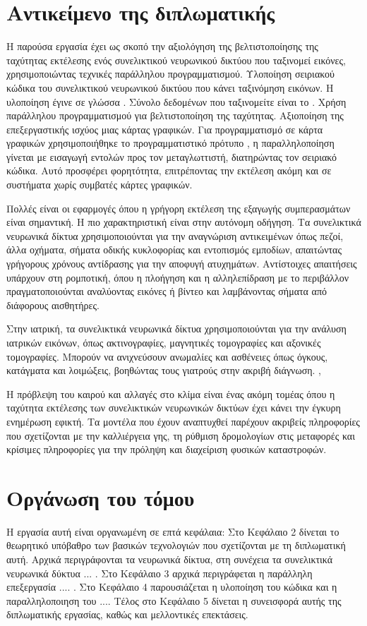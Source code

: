 \section{Αντικείμενο της διπλωματικής}
Η παρούσα εργασία έχει ως σκοπό την αξιολόγηση της βελτιστοποίησης της ταχύτητας εκτέλεσης ενός συνελικτικού νευρωνικού δικτύου που ταξινομεί εικόνες, χρησιμοποιώντας τεχνικές παράλληλου προγραμματισμού. 
Υλοποίηση σειριακού κώδικα του συνελικτικού νευρωνικού δικτύου που κάνει ταξινόμηση εικόνων.
Η υλοποίηση έγινε σε γλώσσα .
Σύνολο δεδομένων που ταξινομείτε είναι το .
Χρήση παράλληλου προγραμματισμού για βελτιστοποίηση της ταχύτητας.
Αξιοποίηση της επεξεργαστικής ισχύος μιας κάρτας γραφικών.
Για προγραμματισμό σε κάρτα γραφικών χρησιμοποιήθηκε το προγραμματιστικό πρότυπο , η παραλληλοποίηση γίνεται με εισαγωγή εντολών προς τον μεταγλωττιστή, διατηρώντας τον σειριακό κώδικα.
Αυτό προσφέρει φορητότητα, επιτρέποντας την εκτέλεση ακόμη και σε συστήματα χωρίς συμβατές κάρτες γραφικών.

 Πολλές είναι οι εφαρμογές όπου η γρήγορη εκτέλεση της εξαγωγής συμπερασμάτων είναι σημαντική. Η πιο χαρακτηριστική είναι στην αυτόνομη οδήγηση. Τα συνελικτικά νευρωνικά δίκτυα χρησιμοποιούνται για την αναγνώριση αντικειμένων όπως πεζοί, άλλα οχήματα, σήματα οδικής κυκλοφορίας και εντοπισμός εμποδίων, απαιτώντας γρήγορους χρόνους αντίδρασης για την αποφυγή ατυχημάτων. Αντίστοιχες απαιτήσεις υπάρχουν στη ρομποτική, όπου η πλοήγηση και η αλληλεπίδραση με το περιβάλλον πραγματοποιούνται αναλύοντας εικόνες ή βίντεο και λαμβάνοντας σήματα από διάφορους αισθητήρες.\cite{Ilas2020}

Στην ιατρική, τα συνελικτικά νευρωνικά δίκτυα χρησιμοποιούνται για την ανάλυση ιατρικών εικόνων, όπως ακτινογραφίες, μαγνητικές τομογραφίες και αξονικές τομογραφίες. Μπορούν να ανιχνεύσουν ανωμαλίες και ασθένειες όπως όγκους, κατάγματα και λοιμώξεις, βοηθώντας τους γιατρούς στην ακριβή διάγνωση. \cite{Ilas2020}, \cite{McKinney2020}

Η πρόβλεψη του καιρού και αλλαγές στο κλίμα είναι ένας ακόμη τομέας όπου η ταχύτητα εκτέλεσης των συνελικτικών νευρωνικών δικτύων έχει κάνει την έγκυρη ενημέρωση εφικτή. Τα μοντέλα που έχουν αναπτυχθεί παρέχουν ακριβείς πληροφορίες που σχετίζονται με την καλλιέργεια γης, τη ρύθμιση δρομολογίων στις μεταφορές και κρίσιμες πληροφορίες για την πρόληψη και διαχείριση φυσικών καταστροφών. \cite{Chen2023}

\section{Οργάνωση του τόμου}
 Η εργασία αυτή είναι οργανωμένη σε επτά κεφάλαια: Στο Κεφάλαιο 2
δίνεται το θεωρητικό υπόβαθρο των βασικών τεχνολογιών που
σχετίζονται με τη διπλωματική αυτή. Αρχικά περιγράφονται τα νευρωνικά δίκτυα, στη συνέχεια τα συνελικτικά νευρωνικά δύκτυα ... . Στο
Κεφάλαιο 3 αρχικά περιγράφεται η παράλληλη επεξεργασία
.... . Στο Κεφάλαιο 4 παρουσιάζεται η υλοποίηση του κώδικα και η παραλληλοποιηση του ....
Τέλος στο Κεφάλαιο 5 δίνεται η συνεισφορά αυτής της
διπλωματικής εργασίας, καθώς και μελλοντικές επεκτάσεις.